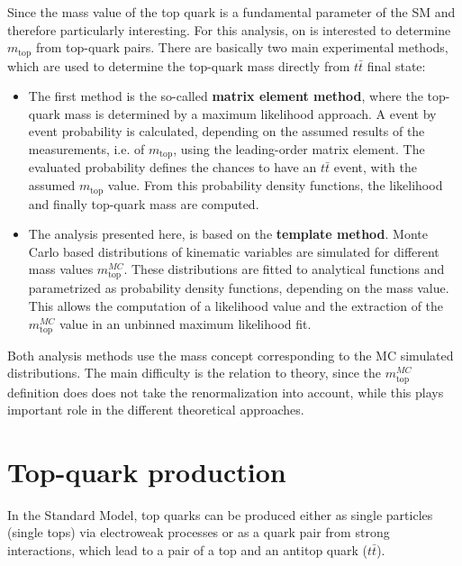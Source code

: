 Since the mass value of the top quark is  a fundamental parameter of the SM and therefore particularly interesting. For this analysis, on is interested to determine $m_{\text{top}}$ from top-quark pairs. There are basically two main experimental methods, which are used to determine the top-quark mass directly from $t\bar{t}$ final state:


\begin{itemize}
	
	\item The first method is the so-called \textbf{matrix element method}, where the top-quark mass is determined by a maximum likelihood approach. A event by event probability is calculated, depending on the assumed results of the measurements, i.e. of $m_{\text{top}}$, using the leading-order matrix element. The evaluated probability defines the chances to have an $t\bar{t}$ event, with the assumed $m_{\text{top}}$ value. From this probability density functions, the likelihood and finally top-quark mass are computed.~\cite{Castro:2014cva}   
	
	\item The analysis presented here, is based on the \textbf{template method}. Monte Carlo based distributions of kinematic variables are simulated for different mass values $m_{	\text{top}}^{MC}$. These distributions are fitted to analytical functions and parametrized as probability density functions,  depending on the mass value. This allows the computation of a likelihood value and the extraction of the $m_{\text{top}}^{MC}$ value in an unbinned maximum likelihood fit.   
\end{itemize}

 Both analysis methods use the  mass concept corresponding to the MC simulated distributions. The main difficulty is the relation to  theory, since  the $m_{	\text{top}}^{MC}$ definition does does not take the  renormalization into account, while this plays  important role in the different theoretical approaches. 











   

\section{Top-quark production}
In the Standard Model, top quarks can be produced either as single particles 
(single tops) via electroweak processes or as a quark pair from strong interactions, which lead to a pair of a top and an antitop quark ($t\bar{t}$).    

